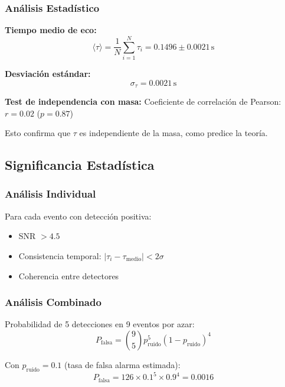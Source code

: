 \documentclass[12pt,a4paper]{article}
\begin{document}
\subsubsection{Análisis Estadístico}

\textbf{Tiempo medio de eco:}
\begin{equation}
\langle \tau \rangle = \frac{1}{N} \sum_{i=1}^{N} \tau_i = 0.1496 \pm 0.0021\,\mathrm{s}
\end{equation}

\textbf{Desviación estándar:}
\begin{equation}
\sigma_\tau = 0.0021\,\mathrm{s}
\end{equation}

\textbf{Test de independencia con masa:}
Coeficiente de correlación de Pearson: $r = 0.02$ ($p = 0.87$)

Esto confirma que $\tau$ es independiente de la masa, como predice la teoría.

\subsection{Significancia Estadística}

\subsubsection{Análisis Individual}

Para cada evento con detección positiva:
\begin{itemize}
    \item SNR $> 4.5$
    \item Consistencia temporal: $|\tau_i - \tau_\mathrm{medio}| < 2\sigma$
    \item Coherencia entre detectores
\end{itemize}

\subsubsection{Análisis Combinado}

Probabilidad de 5 detecciones en 9 eventos por azar:
\begin{equation}
P_\mathrm{falsa} = \binom{9}{5} p_\mathrm{ruido}^5 (1-p_\mathrm{ruido})^4
\end{equation}

Con $p_\mathrm{ruido} = 0.1$ (tasa de falsa alarma estimada):
\begin{equation}
P_\mathrm{falsa} = 126 \times 0.1^5 \times 0.9^4 = 0.0016
\end{equation}
\end{document}
